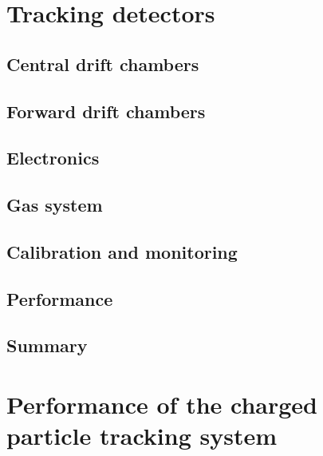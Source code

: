 \section{Tracking detectors \label{sec:tracking}}
\subsection{Central drift chambers \label{sec:cdc}}
\subsection{Forward drift chambers \label{sec:fdc}}
\subsection{Electronics \label{sec:dcelectronics}}
\subsection{Gas system \label{sec:gas}}
\subsection{Calibration and monitoring \label{sec:dccalib}}
\subsection{Performance \label{sec:dcperformance}}
\subsection{Summary \label{sec:dcsummary}}

\section{Performance of the charged particle tracking system}
